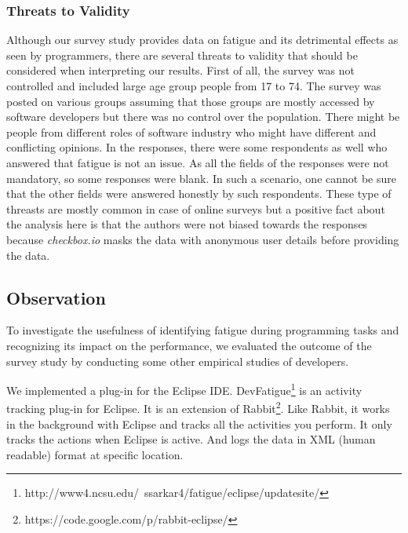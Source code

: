 \documentclass{acm_proc_article-sp}
\begin{document}
\subsubsection{Threats to Validity}
Although our survey study provides data on fatigue and its detrimental effects
as seen by programmers, there are several threats to validity that should be
considered when interpreting our results. First of all, the survey was not
controlled and included large age group people from 17 to 74. The survey was
posted on various groups assuming that those groups are mostly accessed by
software developers but there was no control over the population. There might be
people from different roles of software industry who might have different and
conflicting opinions. In the responses, there were some respondents as well who
answered that fatigue is not an issue. As all the fields of the responses were
not mandatory, so some responses were blank. In such a scenario, one cannot be
sure that the other fields were answered honestly by such respondents. These
type of threasts are mostly common in case of online surveys but a positive fact
about the analysis here is that the authors were not biased towards the
responses because \textit{checkbox.io} masks the data with anonymous user
details before providing the data.

\subsection{Observation}
To investigate the usefulness of identifying fatigue during programming tasks
and recognizing its impact on the performance, we evaluated the outcome of the
survey study by conducting some other empirical studies of developers.

We implemented a plug-in for the Eclipse IDE.
DevFatigue\footnote{http://www4.ncsu.edu/~ssarkar4/fatigue/eclipse/updatesite/}
is an activity tracking plug-in for Eclipse. It is an extension of
Rabbit\footnote{https://code.google.com/p/rabbit-eclipse/\label{rabbitNote}}.
Like Rabbit, it works in the background with Eclipse and tracks all the
activities you perform. It only tracks the actions when Eclipse is active. And
logs the data in XML (human readable) format at specific location.
\end{document}
